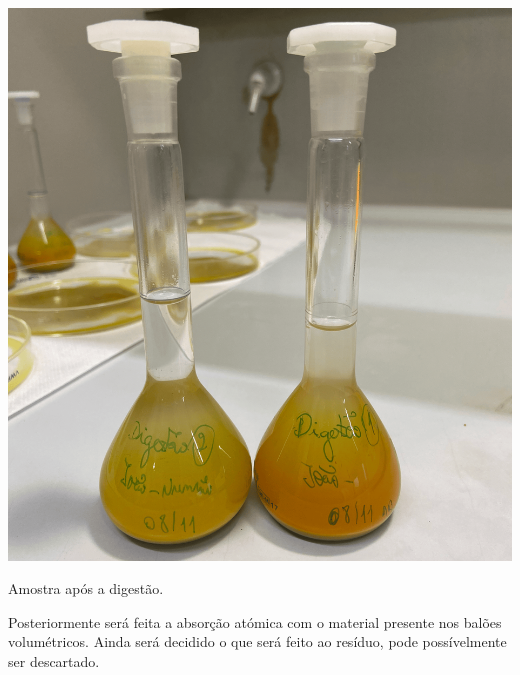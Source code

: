 \begin{marginfigure}[-5\baselineskip]
    \centering
    \includegraphics[width=0.8\linewidth]{figures/Amostra após Digestão}
    \caption{Amostra após a digestão.}
    \label{fig:amostra-apos-digestao}
\end{marginfigure}

Posteriormente será feita a absorção atómica com o material presente nos balões volumétricos.
Ainda será decidido o que será feito ao resíduo, pode possívelmente ser descartado.

